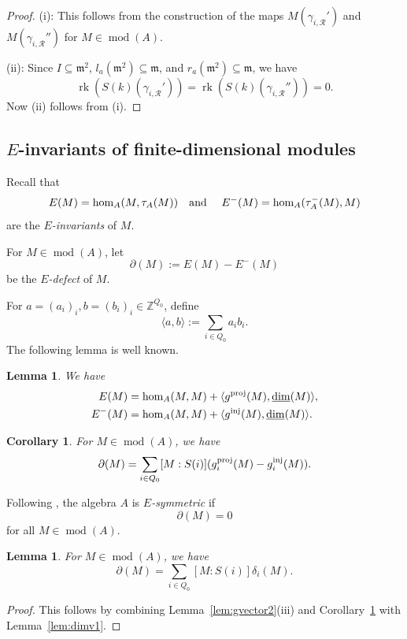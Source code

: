 \documentclass[12pt,reqno]{amsart}
\newtheorem{Lem}[Thm]{Lemma}
\newtheorem{Cor}[Thm]{Corollary}
\theoremstyle{definition}
\newcommand{\Z}{\mathbb{Z}}
\newcommand{\cR}{{\mathcal R}}
\newcommand{\m}{\mathfrak{m}}
\newcommand{\rk}{\operatorname{rk}}
\newcommand{\md}{\operatorname{mod}}
\newcommand{\dimv}{\underline{\dim}}
\newcommand{\bil}[1]{\langle #1\rangle}
\begin{document}
\begin{proof}
(i): 
This follows from the construction of the maps $M(\gamma_{i,\cR}')$
and $M(\gamma_{i,\cR}'')$ for $M \in \md(A)$.

(ii):
Since $I \subseteq \m^2$, $l_a(\m^2) \subseteq \m$,
and $r_a(\m^2) \subseteq \m$, we have 
$$
\rk(S(k)(\gamma_{i,\cR}')) = \rk(S(k)(\gamma_{i,\cR}'')) = 0.
$$
Now (ii) follows from (i).
\end{proof}


\subsection{$E$-invariants of finite-dimensional modules}
Recall that
$$
E(M) = \hom_A(M,\tau_A(M))
\text{\quad and \quad}
E^-(M) = \hom_A(\tau_A^-(M),M)
$$
are the \emph{$E$-invariants} of $M$.


For $M \in \md(A)$, let
$$
\partial(M) := E(M) - E^-(M)
$$
be the \emph{$E$-defect} of $M$.

For $a = (a_i)_i, b = (b_i)_i \in \Z^{Q_0}$, define
$$
\bil{a,b} := \sum_{i \in Q_0} a_ib_i.
$$
The following lemma is well known.

\begin{Lem}\label{lem:Einv1}
We have
\begin{align*}
E(M) &= \hom_A(M,M) + \bil{g^{\rm proj}(M),\dimv(M)}, 
\\
E^-(M) &= \hom_A(M,M) + \bil{g^{\rm inj}(M),\dimv(M)}.
\end{align*}
\end{Lem}

\begin{Cor}\label{cor:Einv1}
For $M \in \md(A)$, we have
$$
\partial(M) =  \sum_{i \in Q_0} [M:S(i)] 
(g_i^{\rm proj}(M) - g_i^{\rm inj}(M)).
$$
\end{Cor}

Following \cite{BS26},
the algebra $A$ is \emph{$E$-symmetric} if
$$
\partial(M) = 0
$$
for all $M \in \md(A)$.

\begin{Lem}\label{lem:Einv2}
For $M \in \md(A)$, we have
$$
\partial(M) = \sum_{i \in Q_0} [M:S(i)] \delta_i(M).
$$
\end{Lem}

\begin{proof}
This follows by combining Lemma~\ref{lem:gvector2}(iii) and Corollary~\ref{cor:Einv1}
 with Lemma~\ref{lem:dimv1}.
\end{proof}
\end{document}
